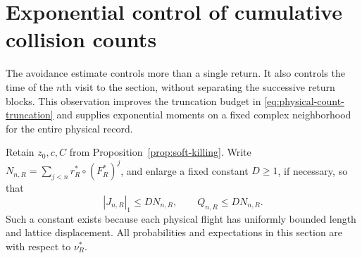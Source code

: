 \section{Exponential control of cumulative collision counts}
\label{sec:cumulative-returns}
The avoidance estimate controls more than a single return. It also
controls the time of the $n$th visit to the section, without separating
the successive return blocks. This observation improves the truncation
budget in \eqref{eq:physical-count-truncation} and supplies exponential
moments on a fixed complex neighborhood for the entire physical record.

Retain $z_0,c,C$ from Proposition~\ref{prop:soft-killing}. Write
$N_{n,R}=\sum_{j<n}r_R^*\circ(F_R^*)^j$, and enlarge a fixed constant
$D\ge1$, if necessary, so that
\begin{equation}\label{eq:cumulative-record-domination}
 |J_{n,R}|_1\le D N_{n,R},\qquad Q_{n,R}\le D N_{n,R}.
\end{equation}
Such a constant exists because each physical flight has uniformly
bounded length and lattice displacement. All probabilities and
expectations in this section are with respect to $\nu_R^*$.


